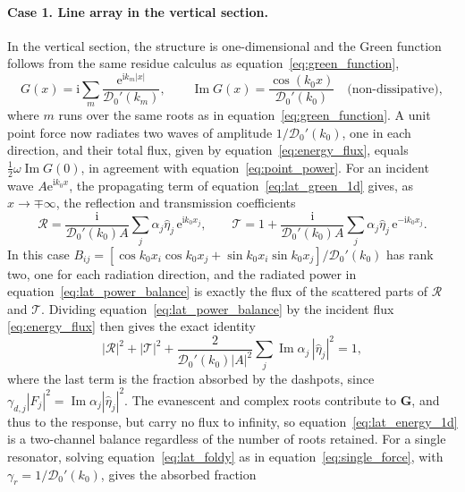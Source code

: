 \paragraph{Case 1. Line array in the vertical section.}
In the vertical section, the structure is one-dimensional and the Green function follows from the same residue calculus as equation~\eqref{eq:green_function},
\begin{equation}\label{eq:lat_green_1d}
    G(x)=\mathrm{i}\sum_m\frac{\mathrm{e}^{\mathrm{i}k_m|x|}}{\mathcal{D}_0'(k_m)},
    \qquad
    \operatorname{Im}G(x)=\frac{\cos(k_0x)}{\mathcal{D}_0'(k_0)}\quad\text{(non-dissipative)},
\end{equation}
where $m$ runs over the same roots as in equation~\eqref{eq:green_function}. A unit point force now radiates two waves of amplitude $1/\mathcal{D}_0'(k_0)$, one in each direction, and their total flux, given by equation~\eqref{eq:energy_flux}, equals $\tfrac12\omega\operatorname{Im}G(0)$, in agreement with equation~\eqref{eq:point_power}. For an incident wave $A\mathrm{e}^{\mathrm{i}k_0x}$, the propagating term of equation~\eqref{eq:lat_green_1d} gives, as $x\to\mp\infty$, the reflection and transmission coefficients
\begin{equation}\label{eq:lat_RT}
    \mathcal{R}=\frac{\mathrm{i}}{\mathcal{D}_0'(k_0)A}\sum_j\alpha_j\widehat{\eta}_j\,\mathrm{e}^{\mathrm{i}k_0x_j},
    \qquad
    \mathcal{T}=1+\frac{\mathrm{i}}{\mathcal{D}_0'(k_0)A}\sum_j\alpha_j\widehat{\eta}_j\,\mathrm{e}^{-\mathrm{i}k_0x_j}.
\end{equation}
In this case $B_{ij}=[\cos k_0x_i\cos k_0x_j+\sin k_0x_i\sin k_0x_j]/\mathcal{D}_0'(k_0)$ has rank two, one for each radiation direction, and the radiated power in equation~\eqref{eq:lat_power_balance} is exactly the flux of the scattered parts of $\mathcal{R}$ and $\mathcal{T}$. Dividing equation~\eqref{eq:lat_power_balance} by the incident flux \eqref{eq:energy_flux} then gives the exact identity
\begin{equation}\label{eq:lat_energy_1d}
    |\mathcal{R}|^2+|\mathcal{T}|^2+\frac{2}{\mathcal{D}_0'(k_0)|A|^2}\sum_j\operatorname{Im}\alpha_j\,|\widehat{\eta}_j|^2=1,
\end{equation}
where the last term is the fraction absorbed by the dashpots, since $\gamma_{d,j}|F_j|^2=\operatorname{Im}\alpha_j|\widehat{\eta}_j|^2$. The evanescent and complex roots contribute to $\mathbf{G}$, and thus to the response, but carry no flux to infinity, so equation~\eqref{eq:lat_energy_1d} is a two-channel balance regardless of the number of roots retained. For a single resonator, solving equation~\eqref{eq:lat_foldy} as in equation~\eqref{eq:single_force}, with $\gamma_r=1/\mathcal{D}_0'(k_0)$, gives the absorbed fraction

